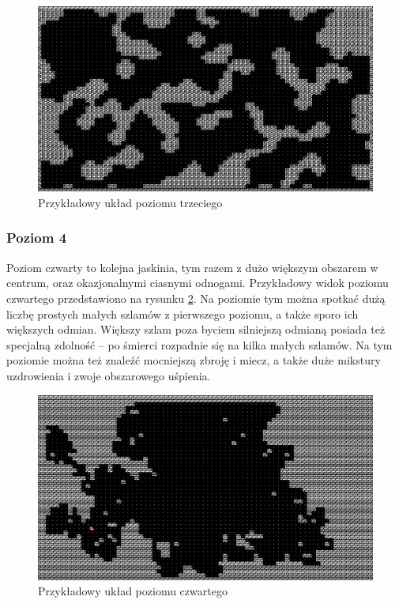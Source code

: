 \documentclass[12pt,twoside]{article}
\begin{document}
\FloatBarrier
\begin{figure}[ht]
	\centering
	\includegraphics[width=12cm]{images/mygame/map3.png}
	\caption{Przykładowy układ poziomu trzeciego}
	\label{mygame:map3}
\end{figure}
\FloatBarrier


\subsubsection{Poziom 4}
Poziom czwarty to kolejna jaskinia, tym razem z dużo większym obszarem w centrum, oraz okazjonalnymi ciasnymi odnogami. Przykładowy widok poziomu czwartego przedstawiono na rysunku \ref{mygame:map4}. Na poziomie tym można spotkać dużą liczbę prostych małych szlamów z pierwszego poziomu, a także sporo ich większych odmian. Większy szlam poza byciem silniejszą odmianą posiada też specjalną zdolność -- po śmierci rozpadnie się na kilka małych szlamów. Na tym poziomie można też znaleźć mocniejszą zbroję i miecz, a także duże mikstury uzdrowienia i zwoje obszarowego uśpienia.

\FloatBarrier
\begin{figure}[ht]
	\centering
	\includegraphics[width=12cm]{images/mygame/map4.png}
	\caption{Przykładowy układ poziomu czwartego}
	\label{mygame:map4}
\end{figure}
\FloatBarrier
\end{document}
